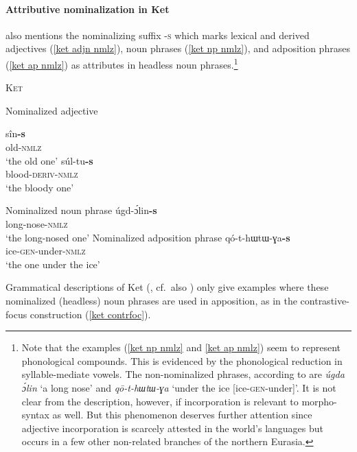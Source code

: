 \paragraph{Attributive nominalization in Ket}
\citet[15, 84–85]{vajda2004} also mentions the nominalizing suffix \textsc{-s} which marks lexical and derived adjectives (\ref{ket adjn nmlz}), noun phrases (\ref{ket np nmlz}), and adposition phrases (\ref{ket ap nmlz}) as attributes in headless noun phrases.\footnote{Note that the examples (\ref{ket np nmlz} and \ref{ket ap nmlz}) seem to represent phonological compounds. This is evidenced by the phonological reduction in syllable-mediate vowels. The non-nominalized phrases, according to \citet{vajda2005} are \textit{úgda ɔ́lin} ‘a long nose’ and \textit{qō-t-hɯtɯ-ɣa} ‘under the ice [ice-\textsc{gen}-under]’. It is not clear from the description, however, if incorporation is relevant to morpho-syntax as well. But this phenomenon deserves further attention since adjective incorporation is scarcely attested in the world's languages but occurs in a few other non-related branches of the northern Eurasia.}
\begin{exe}
\ex \textsc{Ket} \citep{vajda2005}
\begin{xlist}
\ex Nominalized adjective \label{ket adjn nmlz}
\begin{xlist}
\ex	
\gll	sîn\textbf{-s}\\
	old-\textsc{nmlz}\\
\glt	‘the old one’
\ex	
\gll	súl-tu\textbf{-s}\\
	blood-\textsc{deriv-nmlz}\\
\glt	‘the bloody one’
\end{xlist}
\ex	Nominalized noun phrase \label{ket np nmlz}
\gll	úgd-ɔ́lin\textbf{-s}\\
	long-nose-\textsc{nmlz}\\
\glt	‘the long-nosed one’
\ex Nominalized adposition phrase \label{ket ap nmlz}
\gll	qó-t-{hɯtɯ-ɣa}\textbf{-s}\\
	ice-\textsc{gen}-under-\textsc{nmlz}\\
\glt	‘the one under the ice’
\end{xlist}
\end{exe}
Grammatical descriptions of Ket (\citealt{vajda2004}, cf.~also \citealt{krukova2007}) only give examples where these nominalized (headless) noun phrases are used in apposition, as in the contrastive-focus construction (\ref{ket contrfoc}). 
